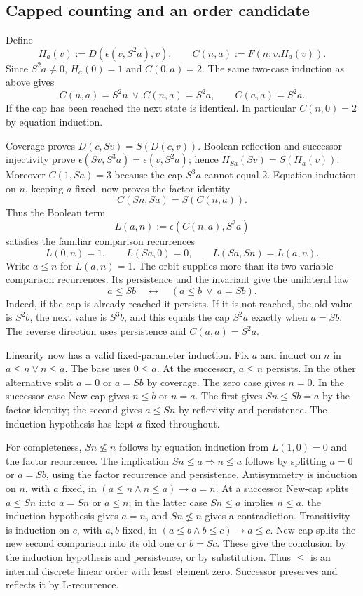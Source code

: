 \subsection{Capped counting and an order candidate}
Define
\[
H_a(v):=D(\epsilon(v,S^2a),v),\qquad C(n,a):=F(n;v.H_a(v)).
\]
Since $S^2a\ne0$, $H_a(0)=1$ and $C(0,a)=2$. The same two-case
induction as above gives
\[
C(n,a)=S^2n\ \lor\ C(n,a)=S^2a,\qquad C(a,a)=S^2a.
\tag{C-invariant}
\]
If the cap has been reached the next state is identical. In particular
$C(n,0)=2$ by equation induction.

Coverage proves $D(c,Sv)=S(D(c,v))$. Boolean reflection and successor
injectivity prove
$\epsilon(Sv,S^3a)=\epsilon(v,S^2a)$; hence
$H_{Sa}(Sv)=S(H_a(v))$. Moreover $C(1,Sa)=3$ because the cap
$S^3a$ cannot equal $2$. Equation induction on $n$, keeping $a$ fixed,
now proves the factor identity
\[
                            C(Sn,Sa)=S(C(n,a)).\tag{C-factor}
\]
Thus the Boolean term
\[
                          L(a,n):=\epsilon(C(n,a),S^2a)
\]
satisfies the familiar comparison recurrences
\[
 L(0,n)=1,\qquad L(Sa,0)=0,\qquad L(Sa,Sn)=L(a,n).
\tag{L-recurrence}
\]
Write $a\le n$ for $L(a,n)=1$. The orbit supplies more than its
two-variable comparison recurrences. Its persistence and the invariant
give the unilateral law
\[
 a\le Sb\quad\longleftrightarrow\quad (a\le b\ \lor\ a=Sb).
 \tag{New-cap}
\]
Indeed, if the cap is already reached it persists. If it is not reached,
the old value is $S^2b$, the next value is $S^3b$, and this equals the
cap $S^2a$ exactly when $a=Sb$. The reverse direction uses persistence
and $C(a,a)=S^2a$.

Linearity now has a valid fixed-parameter induction. Fix $a$ and induct
on $n$ in $a\le n\lor n\le a$. The base uses $0\le a$. At the
successor, $a\le n$ persists. In the other alternative split $a=0$
or $a=Sb$ by coverage. The zero case gives $n=0$. In the successor
case New-cap gives $n\le b$ or $n=a$. The first gives $Sn\le Sb=a$
by the factor identity; the second gives $a\le Sn$ by reflexivity and
persistence. The induction hypothesis has kept $a$ fixed throughout.

For completeness, $Sn\not\le n$ follows by equation induction from
$L(1,0)=0$ and the factor recurrence. The implication
$Sn\le a\Rightarrow n\le a$ follows by splitting $a=0$ or $a=Sb$,
using the factor recurrence and persistence. Antisymmetry is induction
on $n$, with $a$ fixed, in
$(a\le n\wedge n\le a)\to a=n$. At a successor New-cap splits
$a\le Sn$ into $a=Sn$ or $a\le n$; in the latter case $Sn\le a$
implies $n\le a$, the induction hypothesis gives $a=n$, and
$Sn\not\le n$ gives a contradiction. Transitivity is induction on
$c$, with $a,b$ fixed, in
$(a\le b\wedge b\le c)\to a\le c$. New-cap splits the new second
comparison into its old one or $b=Sc$. These give the conclusion by
the induction hypothesis and persistence, or by substitution.
Thus $\le$ is an internal discrete linear order with least element
zero. Successor preserves and reflects it by L-recurrence.

